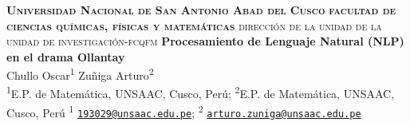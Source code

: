 \documentclass[article,30pt,extrafontsizes]{memoir}
\begin{document}
\begin{topbox}
  \color{titletextcol}
  \vspace{0.5in}
  \LARGE{\textsc{\textbf{Universidad Nacional de San Antonio Abad del Cusco}}
\break \textsc{\textbf{facultad de ciencias químicas, físicas y matemáticas}}
\break \textsc{dirección de la unidad de la unidad de investigación-fcqfm}
\break \textbf{Procesamiento de Lenguaje Natural (NLP) en el drama Ollantay}}  \\[0.3in]  %
  \color{authortextcol} \Large{Chullo Oscar\textsuperscript{1} Zuñiga
Arturo\textsuperscript{2}} \\[0.2in] %
  \color{affiliationtextcol} \large{\textsuperscript{1}E.P. de
Matemática, UNSAAC, Cusco, Perú; \textsuperscript{2}E.P. de Matemática,
UNSAAC, Cusco, Perú \break \textsuperscript{1}
\href{mailto:193029@unsaac.edu.pe}{\nolinkurl{193029@unsaac.edu.pe}};
\textsuperscript{2}
\href{mailto:arturo.zuniga@unsaac.edu.pe}{\nolinkurl{arturo.zuniga@unsaac.edu.pe}}} %
  \vspace{1cm}
\end{topbox}
\sloppy 
\end{document}
